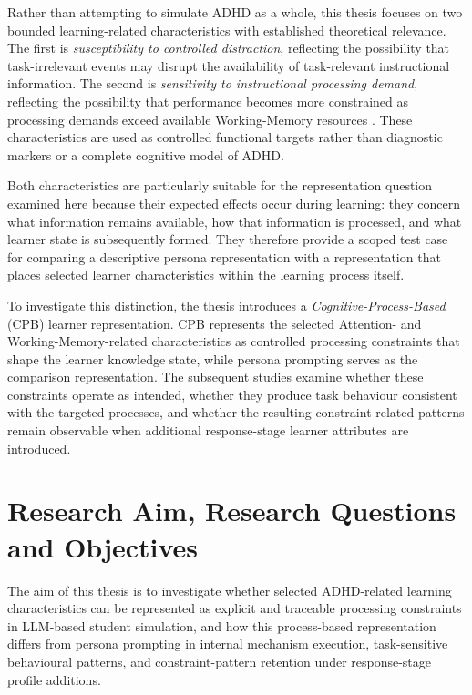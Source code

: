 Rather than attempting to simulate ADHD as a whole, this thesis focuses on two bounded learning-related characteristics with established theoretical relevance. The first is \textit{susceptibility to controlled distraction}, reflecting the possibility that task-irrelevant events may disrupt the availability of task-relevant instructional information. The second is \textit{sensitivity to instructional processing demand}, reflecting the possibility that performance becomes more constrained as processing demands exceed available Working-Memory resources \cite{aboitiz2014irrelevant,martinussen2005meta,kofler2010adhd}. These characteristics are used as controlled functional targets rather than diagnostic markers or a complete cognitive model of ADHD.

Both characteristics are particularly suitable for the representation question examined here because their expected effects occur during learning: they concern what information remains available, how that information is processed, and what learner state is subsequently formed. They therefore provide a scoped test case for comparing a descriptive persona representation with a representation that places selected learner characteristics within the learning process itself.

To investigate this distinction, the thesis introduces a \textit{Cognitive-Process-Based} (CPB) learner representation. CPB represents the selected Attention- and Working-Memory-related characteristics as controlled processing constraints that shape the learner knowledge state, while persona prompting serves as the comparison representation. The subsequent studies examine whether these constraints operate as intended, whether they produce task behaviour consistent with the targeted processes, and whether the resulting constraint-related patterns remain observable when additional response-stage learner attributes are introduced.

\section{Research Aim, Research Questions and Objectives}

The aim of this thesis is to investigate whether selected ADHD-related learning characteristics can be represented as explicit and traceable processing constraints in LLM-based student simulation, and how this process-based representation differs from persona prompting in internal mechanism execution, task-sensitive behavioural patterns, and constraint-pattern retention under response-stage profile additions.


